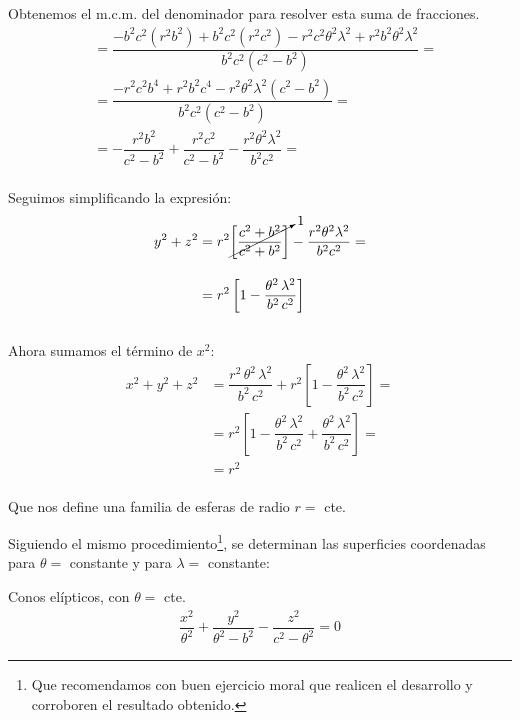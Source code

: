 Obtenemos el m.c.m. del denominador para resolver esta suma de fracciones.
\begin{align*}
&= \dfrac{-b^{2} c^{2} (r^{2} b^{2}) + b^{2} c^{2} (r^{2} c^{2}) - r^{2} c^{2} \theta^{2} \lambda^{2} + r^{2} b^{2} \theta^{2} \lambda^{2}}{b^{2} c^{2} (c^{2} - b^{2})} = \\[1em] 
&= \dfrac{-r^{2} c^{2} b^{4} + r^{2} b^{2} c^{4} - r^{2} \theta^{2} \lambda^{2} (c^{2} - b^{2})}{b^{2} c^{2} (c^{2} - b^{2})} = \\[1em] 
&= - \dfrac{r^{2} b^{2}}{c^{2} - b^{2}} + \dfrac{r^{2} c^{2}}{c^{2} - b^{2}} - \dfrac{r^{2} \theta^{2} \lambda^{2}}{b^{2} c^{2}} =
\end{align*}
\\
Seguimos simplificando la expresión:
\begin{align*}
y^{2} + z^{2} &= r^{2} \cancelto{1}{\left[ \dfrac{c^{2} + b^{2}}{c^{2} + b^{2}} \right]} - \dfrac{r^{2} \theta^{2} \lambda^{2}}{b^{2} c^{2}} = \\[1em]
&= r^{2} \left[ 1 - \dfrac{\theta^{2} \, \lambda^{2}}{b^{2} \, c^{2}} \right]
\end{align*}
\\
Ahora sumamos el término de $x^{2}$:
\begin{align*}
x^{2} + y^{2} + z^{2} &= \dfrac{r^{2} \, \theta^{2} \, \lambda^{2}}{b^{2} \, c^{2}} + r^{2} \left[ 1 - \dfrac{\theta^{2} \, \lambda^{2}}{b^{2} \, c^{2}} \right] = \\[1em] 
&= r^{2} \left[ 1 - \dfrac{\theta^{2} \, \lambda^{2}}{b^{2} \, c^{2}} + \dfrac{\theta^{2} \, \lambda^{2}}{b^{2} \, c^{2}} \right] = \\[1em] 
&= r^{2}
\end{align*}
\\
Que nos define una familia de esferas de radio $r =$ cte.
\par
Siguiendo el mismo procedimiento\footnote{Que recomendamos con buen ejercicio moral que realicen el desarrollo y corroboren el resultado obtenido.}, se determinan las superficies coordenadas para $\theta=$ constante y para $\lambda=$ constante:

Conos elípticos, con $\theta=$ cte.
\begin{align*}
\dfrac{x^{2}}{\theta^{2}} + \dfrac{y^{2}}{\theta^{2} - b^{2}} - \dfrac{z^{2}}{c^{2} - \theta^{2}} = 0
\end{align*}

